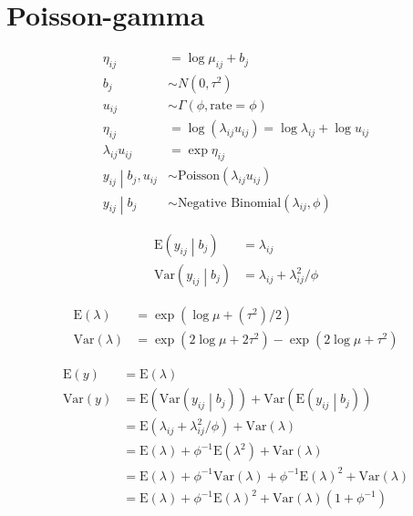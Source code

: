 \documentclass{article}
\begin{document}
\section{Poisson-gamma}
\begin{align*}
\eta_{ij} & = \log{\mu_{ij}} + b_j \\
b_j & \sim N\left(0, \tau^2\right) \\
u_{ij} & \sim \Gamma\left(\phi, \text{rate}=\phi\right) \\
\eta_{ij} & = \log{\left(\lambda_{ij} u_{ij} \right)} = \log{\lambda_{ij}} + \log{u_{ij}} \\
\lambda_{ij} u_{ij} & = \exp{\eta_{ij}} \\
\left.y_{ij} \middle| b_j, u_{ij}\right. & \sim \text{Poisson}\left(\lambda_{ij} u_{ij}\right) \\
\left.y_{ij} \middle| b_j \right. & \sim \text{Negative Binomial}\left(\lambda_{ij}, \phi\right)
\end{align*}

\begin{align*}
\text{E}\left(y_{ij} \middle| b_j\right) & = \lambda_{ij} \\
\text{Var}\left(y_{ij} \middle| b_j\right) & = \lambda_{ij} + \lambda_{ij}^2 / \phi
\end{align*}



\begin{align*}
\text{E}\left(\lambda\right) & = \exp{\left(\log{\mu}+\left(\tau^2\right) / 2\right)} \\
\text{Var}\left(\lambda\right) & = \exp{\left(2 \log{\mu} + 2\tau^2 \right)} - \exp{\left(2\log{\mu} + \tau^2 \right)}
\end{align*}

\begin{align*}
\text{E}\left(y\right) & = \text{E}\left(\lambda\right) \\
\text{Var}\left(y\right) & = \text{E}\left(\text{Var}\left(y_{ij} \middle| b_j \right)\right) +
                                 \text{Var}\left(\text{E}\left(y_{ij} \middle| b_j \right)\right) \\
                        & = \text{E}\left(\lambda_{ij} + \lambda_{ij}^2 / \phi\right) +
                            \text{Var}\left(\lambda\right) \\
                        & = \text{E}\left(\lambda\right)+\phi^{-1} \text{E}\left(\lambda^2\right) + \text{Var}\left(\lambda\right) \\
                        & = \text{E}\left(\lambda\right)+\phi^{-1}\text{Var}\left(\lambda\right) + \phi^{-1}\text{E}\left(\lambda\right)^2 + \text{Var}\left(\lambda\right) \\
                        & = \text{E}\left(\lambda\right) + \phi^{-1}\text{E}\left(\lambda\right)^2 + \text{Var}\left(\lambda\right)\left(1 + \phi^{-1}\right)
\end{align*}
\end{document}
